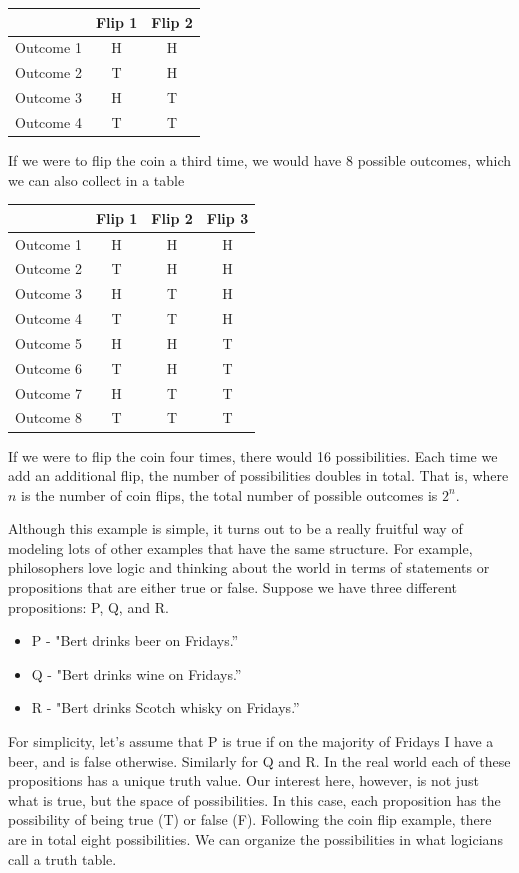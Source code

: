 \documentclass[]{tufte-book}
\providecommand{\tightlist}{%
  \setlength{\itemsep}{0pt}\setlength{\parskip}{0pt}}
\begin{document}
\begin{longtable}[]{@{}lcc@{}}
\toprule
& Flip 1 & Flip 2\tabularnewline
\midrule
\endhead
Outcome 1 & H & H\tabularnewline
Outcome 2 & T & H\tabularnewline
Outcome 3 & H & T\tabularnewline
Outcome 4 & T & T\tabularnewline
\bottomrule
\end{longtable}

If we were to flip the coin a third time, we would have 8 possible outcomes, which we can also collect in a table

\begin{longtable}[]{@{}lccc@{}}
\toprule
& Flip 1 & Flip 2 & Flip 3\tabularnewline
\midrule
\endhead
Outcome 1 & H & H & H\tabularnewline
Outcome 2 & T & H & H\tabularnewline
Outcome 3 & H & T & H\tabularnewline
Outcome 4 & T & T & H\tabularnewline
Outcome 5 & H & H & T\tabularnewline
Outcome 6 & T & H & T\tabularnewline
Outcome 7 & H & T & T\tabularnewline
Outcome 8 & T & T & T\tabularnewline
\bottomrule
\end{longtable}

If we were to flip the coin four times, there would 16 possibilities. Each time we add an additional flip, the number of possibilities doubles in total. That is, where \(n\) is the number of coin flips, the total number of possible outcomes is \(2^n\).

Although this example is simple, it turns out to be a really fruitful way of modeling lots of other examples that have the same structure. For example, philosophers love logic and thinking about the world in terms of statements or propositions that are either true or false. Suppose we have three different propositions: P, Q, and R.

\begin{itemize}
\tightlist
\item
  P - "Bert drinks beer on Fridays.''
\item
  Q - "Bert drinks wine on Fridays.''
\item
  R - "Bert drinks Scotch whisky on Fridays.''
\end{itemize}

For simplicity, let's assume that P is true if on the majority of Fridays I have a beer, and is false otherwise. Similarly for Q and R. In the real world each of these propositions has a unique truth value. Our interest here, however, is not just what is true, but the space of possibilities. In this case, each proposition has the possibility of being true (T) or false (F). Following the coin flip example, there are in total eight possibilities. We can organize the possibilities in what logicians call a truth table.
\end{document}
